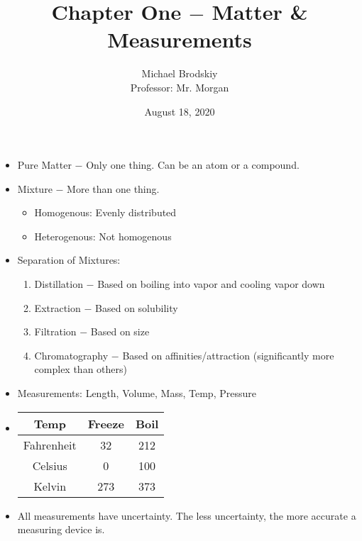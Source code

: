 \documentclass[12pt]{article}
\title{Chapter One $-$ Matter \& Measurements}
\date{August 18, 2020}
\author{Michael Brodskiy\\ \small Professor: Mr. Morgan}
\begin{document}
\maketitle

\begin{itemize}

  \item Pure Matter $-$ Only one thing. Can be an atom or a compound.

  \item Mixture $-$ More than one thing.

    \begin{itemize}

      \item Homogenous: Evenly distributed

      \item Heterogenous: Not homogenous

    \end{itemize}

  \item Separation of Mixtures:

    \begin{enumerate}

      \item Distillation $-$ Based on boiling into vapor and cooling vapor down

      \item Extraction $-$ Based on solubility

      \item Filtration $-$ Based on size

      \item Chromatography $-$ Based on affinities/attraction (significantly more complex than others)

    \end{enumerate}

  \item Measurements: Length, Volume, Mass, Temp, Pressure

  \item \begin{tabular}{c c c}
      Temp & Freeze & Boil \\
      \hline
      Fahrenheit & 32 & 212 \\
      Celsius & 0 & 100\\
      Kelvin & 273 & 373 \\
    \end{tabular}

  \item All measurements have uncertainty. The less uncertainty, the more accurate a measuring device is.


\end{itemize}
\end{document}
